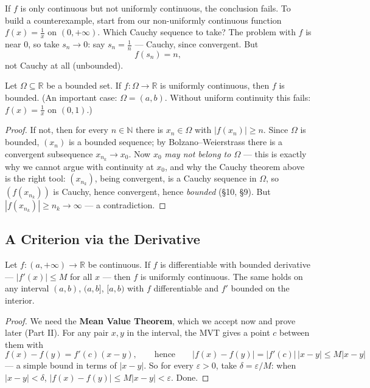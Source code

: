 \documentclass[11pt]{report}
\begin{document}
\begin{rembox}
If $f$ is only continuous but not uniformly continuous, the conclusion fails. To build a counterexample, start from our non-uniformly continuous function $f(x) = \tfrac1x$ on $(0,+\infty)$. Which Cauchy sequence to take? The problem with $f$ is near $0$, so take $s_n \to 0$: say $s_n = \tfrac1n$ --- Cauchy, since convergent. But
\[
f(s_n) = n,
\]
not Cauchy at all (unbounded).
\end{rembox}

\begin{propbox}
Let $\Omega \subseteq \mathbb{R}$ be a bounded set. If $f: \Omega \to \mathbb{R}$ is uniformly continuous, then $f$ is bounded. (An important case: $\Omega = (a,b)$. Without uniform continuity this fails: $f(x) = \tfrac1x$ on $(0,1)$.)
\end{propbox}

\begin{proof}
If not, then for every $n \in \mathbb{N}$ there is $x_n \in \Omega$ with $|f(x_n)| \geq n$. Since $\Omega$ is bounded, $(x_n)$ is a bounded sequence; by Bolzano--Weierstrass there is a convergent subsequence $x_{n_k} \to x_0$. Now $x_0$ \emph{may not belong to $\Omega$} --- this is exactly why we cannot argue with continuity at $x_0$, and why the Cauchy theorem above is the right tool: $(x_{n_k})$, being convergent, is a Cauchy sequence in $\Omega$, so $(f(x_{n_k}))$ is Cauchy, hence convergent, hence \emph{bounded} (\S 10, \S 9). But $|f(x_{n_k})| \geq n_k \to \infty$ --- a contradiction.
\end{proof}

\subsection{A Criterion via the Derivative}

\begin{thmbox}
Let $f: (a, +\infty) \to \mathbb{R}$ be continuous. If $f$ is differentiable with bounded derivative --- $|f'(x)| \leq M$ for all $x$ --- then $f$ is uniformly continuous. The same holds on any interval $(a,b)$, $(a,b]$, $[a,b)$ with $f$ differentiable and $f'$ bounded on the interior.
\end{thmbox}

\begin{proof}
We need the \textbf{Mean Value Theorem}, which we accept now and prove later (Part II). For any pair $x, y$ in the interval, the MVT gives a point $c$ between them with
\[
f(x) - f(y) = f'(c)(x - y), \qquad \text{hence} \qquad |f(x) - f(y)| = |f'(c)|\,|x-y| \leq M |x - y|
\]
--- a simple bound in terms of $|x-y|$. So for every $\varepsilon > 0$, take $\delta = \varepsilon / M$: when $|x - y| < \delta$, $|f(x) - f(y)| \leq M|x-y| < \varepsilon$. Done.
\end{proof}
\end{document}

